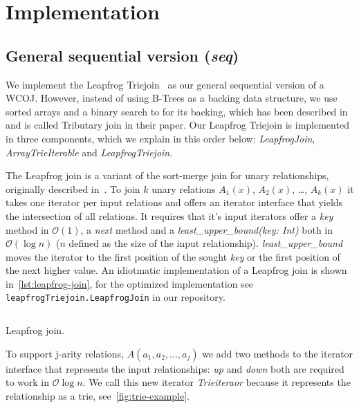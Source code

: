 \section{Implementation}\label{sec:implementation}

\subsection{General sequential version (\textit{seq})}\label{subsec:general-sequential-version}
We implement the Leapfrog Triejoin~\cite{leapfrog} as our general sequential version of a WCOJ.
However, instead of using B-Trees as a backing data structure, we use sorted arrays and a binary search
to for its backing, which has been described in~\cite{myria-detailed} and is called Tributary join in their paper.
Our Leapfrog Triejoin is implemented in three components, which we explain in this order below: \textit{LeapfrogJoin}, \textit{ArrayTrieIterable} and
\textit{LeapfrogTriejoin}.

The Leapfrog join is a variant of the sort-merge join for unary relationships, originally described in~\cite{leapfrog1,leapfrog2}. %
To join $k$ unary relations $A_1(x)$, $A_2(x)$, \dots, $A_k(x)$ it takes one iterator per input relations and offers an iterator
interface that yields the intersection of all relations.
It requires that it's input iterators offer a \textit{key} method in $\mathcal{O}(1)$, a \textit{next} method and
a \textit{least\_upper\_bound(key: Int)} both in $\mathcal{O} (\log n)$ ($n$ defined as the size of the input relationship).
\textit{least\_upper\_bound} moves the iterator to the first position of the sought \textit{key} or the first position of the
next higher value.
An idiotmatic implementation of a Leapfrog join is shown in~\cref{lst:leapfrog-join}, for the optimized implementation see
\texttt{leapfrogTriejoin.LeapfrogJoin} in our repository.  %

\begin{listing}[H]
    \inputminted{scala}{code/LeapfrogJoin.scala}
    \caption{Leapfrog join.}
    \label{lst:leapfrog-join}
\end{listing}

To support j-arity relations, $A(a_1, a_2, \dots, a_j)$ we add two methods to the iterator interface that represents the input
relationships: \textit{up} and \textit{down} both are required to work in $\mathcal{O} \log n$.
We call this new iterator \textit{Trieiteraor} because it represents the relationship as a trie, see~\cref{fig:trie-example}.

